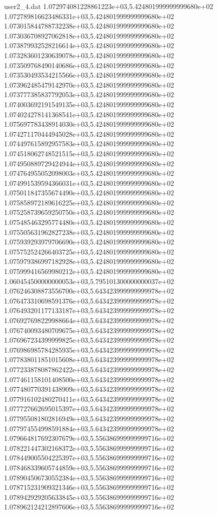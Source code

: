 \begin{filecontents}{user2_4.dat}
1.072974081228861223e+03,5.424801999999999680e+02
1.072789816623486331e+03,5.424801999999999680e+02
1.073015844788732238e+03,5.424801999999999680e+02
1.073036708927062818e+03,5.424801999999999680e+02
1.073879932528216614e+03,5.424801999999999680e+02
1.073283601230639078e+03,5.424801999999999680e+02
1.073509768490140686e+03,5.424801999999999680e+02
1.073530493534215566e+03,5.424801999999999680e+02
1.073962485479142970e+03,5.424801999999999680e+02
1.073777385837792053e+03,5.424801999999999680e+02
1.074003692191549135e+03,5.424801999999999680e+02
1.074024278141368541e+03,5.424801999999999680e+02
1.075697783438914030e+03,5.424801999999999680e+02
1.074271170444945028e+03,5.424801999999999680e+02
1.074497615892957583e+03,5.424801999999999680e+02
1.074518062748521515e+03,5.424801999999999680e+02
1.074950889729424944e+03,5.424801999999999680e+02
1.074764955052098003e+03,5.424801999999999680e+02
1.074991539594366031e+03,5.424801999999999680e+02
1.075011847355674490e+03,5.424801999999999680e+02
1.075858972189616225e+03,5.424801999999999680e+02
1.075258739659250750e+03,5.424801999999999680e+02
1.075485463295774480e+03,5.424801999999999680e+02
1.075505631962827238e+03,5.424801999999999680e+02
1.075939293979706690e+03,5.424801999999999680e+02
1.075752524266403725e+03,5.424801999999999680e+02
1.075979386997182928e+03,5.424801999999999680e+02
1.075999416569980212e+03,5.424801999999999680e+02
1.060454500000000053e+03,5.795101300000000037e+02
1.076246308873556700e+03,5.643423999999999978e+02
1.076473310698591376e+03,5.643423999999999978e+02
1.076493201177133187e+03,5.643423999999999978e+02
1.076927698229988664e+03,5.643423999999999978e+02
1.076740093480709675e+03,5.643423999999999978e+02
1.076967234399999825e+03,5.643423999999999978e+02
1.076986985784285935e+03,5.643423999999999978e+02
1.077838011851015608e+03,5.643423999999999978e+02
1.077233878087862422e+03,5.643423999999999978e+02
1.077461158101408500e+03,5.643423999999999978e+02
1.077480770391438909e+03,5.643423999999999978e+02
1.077916102480270411e+03,5.643423999999999978e+02
1.077727662695015397e+03,5.643423999999999978e+02
1.077955081802816949e+03,5.643423999999999978e+02
1.077974554998591884e+03,5.643423999999999978e+02
1.079664817692307679e+03,5.556386999999999716e+02
1.078221447302168372e+03,5.556386999999999716e+02
1.078449005504225397e+03,5.556386999999999716e+02
1.078468339605744859e+03,5.556386999999999716e+02
1.078904506730552384e+03,5.556386999999999716e+02
1.078715231909321346e+03,5.556386999999999716e+02
1.078942929205633845e+03,5.556386999999999716e+02
1.078962124212897606e+03,5.556386999999999716e+02

\end{filecontents}
